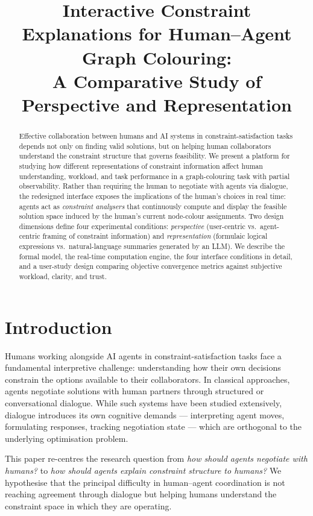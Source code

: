 \documentclass[10pt]{article}
\title{Interactive Constraint Explanations for Human--Agent Graph Colouring:\\
       A Comparative Study of Perspective and Representation}
\author{}
\date{}
\theoremstyle{definition}
\begin{document}
\maketitle

\begin{abstract}
Effective collaboration between humans and AI systems in constraint-satisfaction tasks depends not
only on finding valid solutions, but on helping human collaborators understand the constraint
structure that governs feasibility.  We present a platform for studying how different
representations of constraint information affect human understanding, workload, and task performance
in a graph-colouring task with partial observability.  Rather than requiring the human to negotiate
with agents via dialogue, the redesigned interface exposes the implications of the human's choices
in real time: agents act as \emph{constraint analysers} that continuously compute and display the
feasible solution space induced by the human's current node-colour assignments.  Two design
dimensions define four experimental conditions: \emph{perspective} (user-centric vs.\
agent-centric framing of constraint information) and \emph{representation} (formulaic logical
expressions vs.\ natural-language summaries generated by an LLM).  We describe the formal model,
the real-time computation engine, the four interface conditions in detail, and a user-study design
comparing objective convergence metrics against subjective workload, clarity, and trust.
\end{abstract}

\section{Introduction}
\label{sec:intro}

Humans working alongside AI agents in constraint-satisfaction tasks face a fundamental
interpretive challenge: understanding how their own decisions constrain the options available to
their collaborators.  In classical approaches, agents negotiate solutions with human partners
through structured or conversational dialogue.  While such systems have been studied extensively,
dialogue introduces its own cognitive demands --- interpreting agent moves, formulating responses,
tracking negotiation state --- which are orthogonal to the underlying optimisation problem.

This paper re-centres the research question from \emph{how should agents negotiate with humans?}
to \emph{how should agents explain constraint structure to humans?}  We hypothesise that the
principal difficulty in human--agent coordination is not reaching agreement through dialogue but
helping humans understand the constraint space in which they are operating.
\end{document}
